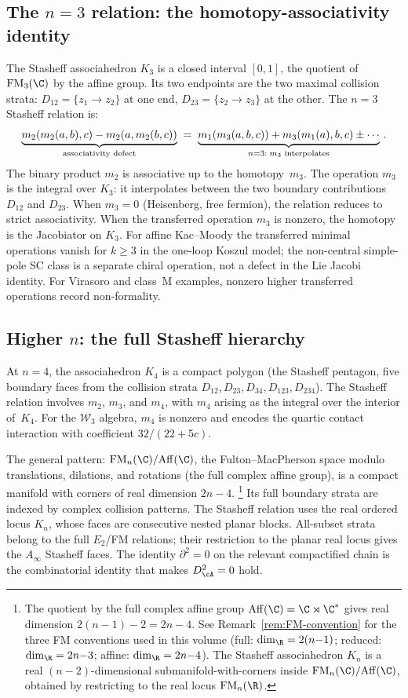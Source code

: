 \subsection*{The $n = 3$ relation: the homotopy-associativity
identity}

The Stasheff associahedron $K_3$ is a closed interval $[0,1]$,
the quotient of $\FM_3(\C)$ by the affine group.
Its two endpoints are the two maximal collision strata:
$D_{12}=\{z_1\to z_2\}$ at one end,
$D_{23}=\{z_2\to z_3\}$ at the other.
The $n=3$ Stasheff relation is:
\[
\underbrace{m_2(m_2(a,b),c) - m_2(a,m_2(b,c))}_{%
 \text{associativity defect}}
\;=\;
\underbrace{m_1(m_3(a,b,c)) + m_3(m_1(a),b,c)
\pm\cdots}_{n=3:\;m_3\text{~interpolates}}\,.
\]
The binary product $m_2$ is associative up to the homotopy~$m_3$.
The operation $m_3$ is the integral over $K_3$:
it interpolates between the two boundary contributions
$D_{12}$ and $D_{23}$. When $m_3=0$ (Heisenberg, free
fermion), the relation reduces to strict associativity.
When the transferred operation $m_3$ is nonzero, the homotopy is the
Jacobiator on $K_3$.  For affine Kac--Moody the transferred minimal
operations vanish for $k \ge 3$ in the one-loop Koszul model; the
non-central simple-pole SC class is a separate chiral operation, not a
defect in the Lie Jacobi identity.  For Virasoro and class~M examples,
nonzero higher transferred operations record non-formality.

\subsection*{Higher $n$: the full Stasheff hierarchy}

At $n=4$, the associahedron $K_4$ is a compact polygon
(the Stasheff pentagon, five boundary faces from the
collision strata $D_{12}, D_{23}, D_{34}, D_{123}, D_{234}$).
The Stasheff relation involves $m_2$, $m_3$, and $m_4$,
with $m_4$ arising as the integral over the interior of~$K_4$. For the
$\mathcal{W}_3$ algebra, $m_4$ is nonzero and encodes the quartic
contact interaction with coefficient $32/(22+5c)$.

The general pattern: $\FM_n(\C)/\mathrm{Aff}(\C)$, the Fulton--MacPherson
space modulo translations, dilations, and rotations (the full complex
affine group), is a compact manifold with corners of real
dimension $2n - 4$.%
\footnote{The quotient by the full complex affine group
$\mathrm{Aff}(\C) = \C \rtimes \C^*$ gives real dimension
$2(n{-}1) - 2 = 2n{-}4$. See Remark~\ref{rem:FM-convention}
for the three FM conventions used in this volume
(full: $\dim_\R = 2(n{-}1)$; reduced: $\dim_\R = 2n{-}3$;
affine: $\dim_\R = 2n{-}4$).
The Stasheff associahedron $K_n$ is a real $(n{-}2)$-dimensional
submanifold-with-corners inside $\FM_n(\C)/\mathrm{Aff}(\C)$,
obtained by restricting to the real locus $\FM_n(\R)$.}
Its full boundary strata are indexed by complex collision patterns.
The Stasheff relation uses the real ordered locus $K_n$, whose faces
are consecutive nested planar blocks.  All-subset strata belong to the
full $E_2$/FM relations; their restriction to the planar real locus
gives the $A_\infty$ Stasheff faces.  The identity
$\partial^2 = 0$ on the relevant compactified chain is the
combinatorial identity that makes $D_\cA^2 = 0$ hold.


